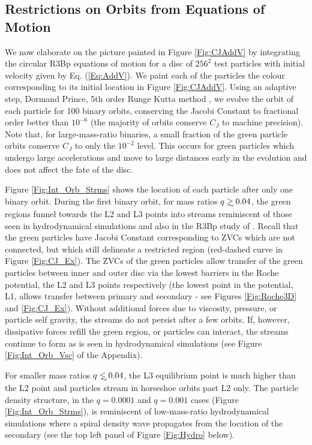 \subsection{Restrictions on Orbits from Equations of Motion}
\label{Integration of the equations of motion}
We now elaborate on the picture painted in Figure \ref{Fig:CJAddV} by
integrating the circular R3Bp equations of motion for a disc of
$256^2$ test particles with initial velocity given by
Eq. (\ref{Eq:AddV}). We paint each of the particles the colour
corresponding to its initial location in Figure
\ref{Fig:CJAddV}. Using an adaptive step, Dormand Prince, 5th order
Runge Kutta method \citep{NumRec:2007}, we evolve the orbit of each
particle for 100 binary orbits, conserving the Jacobi
Constant to fractional order better than $10^{-6}$ (the majority of
orbits conserve $C_J$ to machine precision). Note that, for
large-mass-ratio binaries, a small fraction of the green particle orbits
conserve $C_J$ to only the $10^{-2}$ level. This occurs for green
particles which undergo large accelerations and move to large
distances early in the evolution and does not affect the fate of the
disc.



Figure \ref{Fig:Int_Orb_Strms} shows the location of each particle
after only one binary orbit. During the first binary orbit, for mass
ratios $q \gsim 0.04$, the green regions funnel towards the L2 and L3
points into streams reminiscent of those seen in hydrodynamical
simulations and also in the R3Bp study of
\cite{DHM:2013:MNRAS}. Recall that the green particles have Jacobi
Constant corresponding to ZVCs which are not connected, but which
still delineate a restricted region (red-dashed curve in Figure
\ref{Fig:CJ_Ex}). The ZVCs of the green particles allow transfer of the green particles
between inner and outer disc via the lowest barriers in the Roche
potential, the L2 and L3 points respectively (the lowest point in the
potential, L1, allows transfer between primary and secondary - see Figures \ref{Fig:Roche3D} and \ref{Fig:CJ_Ex}). Without
additional forces due to viscosity, pressure, or particle self gravity, the streams do not
persist after a few orbits. If, however, dissipative forces refill the
green region, or particles can interact, the streams continue to form as is seen in
hydrodynamical simulations (see Figure \ref{Fig:Int_Orb_Vsc} of the
Appendix).


For smaller mass ratios $q \lsim 0.04$, the L3 equilibrium point is
much higher than the L2 point and particles stream in horseshoe orbits
past L2 only. The particle density structure, in the $q=0.0001$ and $q=0.001$ cases 
(Figure \ref{Fig:Int_Orb_Strms}), is reminiscent of low-mass-ratio hydrodynamical
simulations where a spiral density wave propagates from the location of the secondary 
(see the top left panel of Figure \ref{Fig:Hydro} below).


